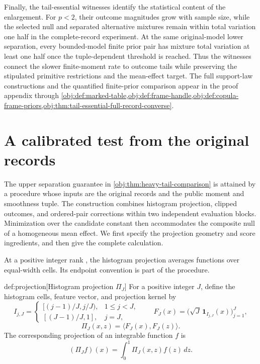 \documentclass[11pt]{article}
\begin{document}
Finally, the tail-essential witnesses identify the statistical content of the enlargement. For \(p<2\), their outcome magnitudes grow with sample size, while the selected null and separated alternative mixtures remain within total variation one half in the complete-record experiment. At the same original-model lower separation, every bounded-model finite prior pair has mixture total variation at least one half once the tuple-dependent threshold is reached. Thus the witnesses connect the slower finite-moment rate to outcome tails while preserving the stipulated primitive restrictions and the mean-effect target. The full support-law constructions and the quantified finite-prior comparison appear in the proof appendix through \cref{obj:def:marked-table,obj:def:frame-handle,obj:def:copula-frame-priors,obj:thm:tail-essential-full-record-converse}.


\section{A calibrated test from the original records}

The upper separation guarantee in \cref{obj:thm:heavy-tail-comparison} is attained by a procedure whose inputs are the original records and the public moment and smoothness tuple. The construction combines histogram projection, clipped outcomes, and ordered-pair corrections within two independent evaluation blocks. Minimization over the candidate constant then accommodates the composite null of a homogeneous mean effect. We first specify the projection geometry and score ingredients, and then give the complete calculation.

At a positive integer rank , the histogram projection averages functions over equal-width cells. Its endpoint convention is part of the procedure.

\begin{definitionv}{def:projection}[Histogram projection \(\Pi_J\)]
For a positive integer \(J\), define the histogram cells, feature vector, and projection kernel by
\[
I_{j,J}=
\begin{cases}
[(j-1)/J,j/J),&1\le j<J,\\
[(J-1)/J,1],&j=J,
\end{cases}
\qquad
F_J(x)=\bigl(\sqrt J\,\mathbf 1_{I_{j,J}}(x)\bigr)_{j=1}^J,
\]
\[
\Pi_J(x,z)=\langle F_J(x),F_J(z)\rangle.
\]
The corresponding projection of an integrable function \(f\) is
\[
(\Pi_J f)(x)=\int_0^1\Pi_J(x,z)f(z)\,dz.
\]
\end{definitionv}
\end{document}
